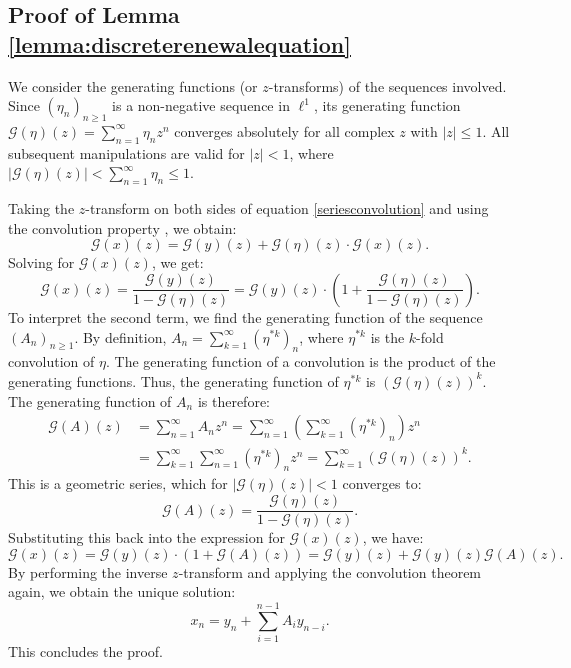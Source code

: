\documentclass[letterpaper]{article}
\numberwithin{equation}{section}
\theoremstyle{definition}
\theoremstyle{remark}
\begin{document}


\subsection{Proof of Lemma \ref{lemma:discreterenewalequation}}
\label{subsec:proofofdiscreterenewalequation}
  We consider the generating functions (or $z$-transforms) of the sequences involved. Since $(\eta_n)_{n\ge1}$ is a non-negative sequence in $\ell^1$, its generating function $\mathcal{G}(\eta)(z) = \sum_{n=1}^\infty \eta_n z^n$ converges absolutely for all complex $z$ with $|z| \le 1$. All subsequent manipulations are valid for $|z|<1$, where $|\mathcal{G}(\eta)(z)| < \sum_{n=1}^\infty \eta_n \le 1$.

  Taking the $z$-transform on both sides of equation \eqref{seriesconvolution} and using the convolution property \cite{oppenheim1999discrete}, we obtain:
  \[
    \mathcal{G}(x)(z) = \mathcal{G}(y)(z) + \mathcal{G}(\eta)(z) \cdot \mathcal{G}(x)(z).
  \]
  Solving for $\mathcal{G}(x)(z)$, we get:
  \[
    \mathcal{G}(x)(z) = \frac{\mathcal{G}(y)(z)}{1 - \mathcal{G}(\eta)(z)} = \mathcal{G}(y)(z) \cdot \left(1 + \frac{\mathcal{G}(\eta)(z)}{1 - \mathcal{G}(\eta)(z)}\right).
  \]
  To interpret the second term, we find the generating function of the sequence $(A_n)_{n\ge1}$. By definition, $A_n = \sum_{k=1}^\infty (\eta^{*k})_n$, where $\eta^{*k}$ is the $k$-fold convolution of $\eta$. The generating function of a convolution is the product of the generating functions. Thus, the generating function of $\eta^{*k}$ is $(\mathcal{G}(\eta)(z))^k$. The generating function of $A_n$ is therefore:
  \begin{align*}
    \mathcal{G}(A)(z) &= \sum_{n=1}^\infty A_n z^n = \sum_{n=1}^\infty \left( \sum_{k=1}^\infty (\eta^{*k})_n \right) z^n \\
    &= \sum_{k=1}^\infty \sum_{n=1}^\infty (\eta^{*k})_n z^n = \sum_{k=1}^\infty (\mathcal{G}(\eta)(z))^k.
  \end{align*}
  This is a geometric series, which for $|\mathcal{G}(\eta)(z)|<1$ converges to:
  \[
    \mathcal{G}(A)(z) = \frac{\mathcal{G}(\eta)(z)}{1 - \mathcal{G}(\eta)(z)}.
  \]
  Substituting this back into the expression for $\mathcal{G}(x)(z)$, we have:
  \[
    \mathcal{G}(x)(z) = \mathcal{G}(y)(z) \cdot (1 + \mathcal{G}(A)(z)) = \mathcal{G}(y)(z) + \mathcal{G}(y)(z)\mathcal{G}(A)(z).
  \]
  By performing the inverse $z$-transform and applying the convolution theorem again, we obtain the unique solution:
  \[
    x_n = y_n + \sum_{i=1}^{n-1} A_i y_{n-i}.
  \]
  This concludes the proof.
\end{document}
